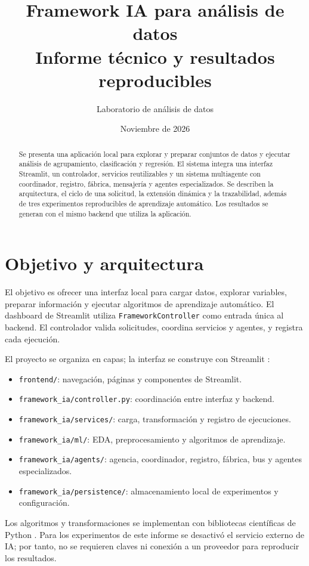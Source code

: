 \documentclass[11pt,a4paper]{article}
\title{Framework IA para análisis de datos\\\large Informe técnico y resultados reproducibles}
\author{Laboratorio de análisis de datos}
\date{Noviembre de 2026}
\begin{document}
\maketitle
\begin{abstract}
Se presenta una aplicación local para explorar y preparar conjuntos de datos y ejecutar análisis de agrupamiento,
clasificación y regresión. El sistema integra una interfaz Streamlit, un controlador, servicios reutilizables y un
sistema multiagente con coordinador, registro, fábrica, mensajería y agentes especializados. Se describen la
arquitectura, el ciclo de una solicitud, la extensión dinámica y la trazabilidad, además de tres experimentos
reproducibles de aprendizaje automático. Los resultados se generan con el mismo backend que utiliza la aplicación.
\end{abstract}
\tableofcontents
\newpage

\section{Objetivo y arquitectura}
El objetivo es ofrecer una interfaz local para cargar datos, explorar variables, preparar información y ejecutar
algoritmos de aprendizaje automático. El dashboard de Streamlit utiliza \texttt{FrameworkController} como entrada
única al backend. El controlador valida solicitudes, coordina servicios y agentes, y registra cada ejecución.

El proyecto se organiza en capas; la interfaz se construye con Streamlit \citep{streamlitdocs}:
\begin{itemize}[nosep]
  \item \texttt{frontend/}: navegación, páginas y componentes de Streamlit.
  \item \texttt{framework\_ia/controller.py}: coordinación entre interfaz y backend.
  \item \texttt{framework\_ia/services/}: carga, transformación y registro de ejecuciones.
  \item \texttt{framework\_ia/ml/}: EDA, preprocesamiento y algoritmos de aprendizaje.
  \item \texttt{framework\_ia/agents/}: agencia, coordinador, registro, fábrica, bus y agentes especializados.
  \item \texttt{framework\_ia/persistence/}: almacenamiento local de experimentos y configuración.
\end{itemize}
Los algoritmos y transformaciones se implementan con bibliotecas científicas de Python \citep{pedregosa2011scikit}.
Para los experimentos de este informe se desactivó el servicio externo de IA; por tanto, no se requieren claves ni
conexión a un proveedor para reproducir los resultados.
\end{document}
